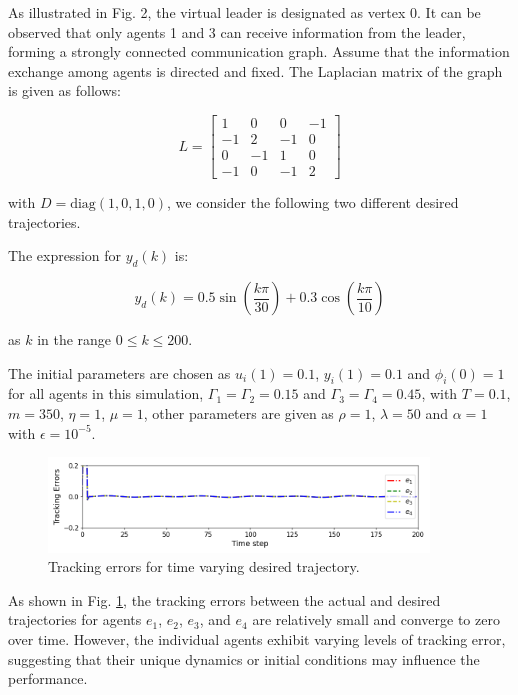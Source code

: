 \documentclass[journal,onecolumn]{IEEEtran}
\begin{document}
As illustrated in Fig. 2, the virtual leader is designated as vertex 0. It can be observed that only agents 1 and 3 can receive information from the leader, forming a strongly connected communication graph. Assume that the information exchange among agents is directed and fixed. The Laplacian matrix of the graph is given as follows:

\[
    L = \begin{bmatrix}
    1 & 0 & 0 & -1 \\
    -1 & 2 & -1 & 0 \\
    0 & -1 & 1 & 0 \\
    -1 & 0 & -1 & 2
    \end{bmatrix}
\]

with \( D = \text{diag}(1, 0, 1, 0) \), we consider the following two different desired trajectories.




The expression for \( y_d(k) \) is:

\[
y_d(k) = 0.5 \sin\left(\frac{k \pi}{30}\right) + 0.3  \cos\left(\frac{k \pi}{10}\right)
\]

as \( k \) in the range \( 0 \leq k \leq 200 \).

The initial parameters are chosen as \(u_i(1)=0.1\), \(y_i(1)=0.1\) and \(\phi_i(0)=1 \) for all agents in this simulation, \(\Gamma_{1}=\Gamma_{2}=0.15\) and \(\Gamma_{3}=\Gamma_{4}=0.45\), with \(T=0.1\), \(m=350\), \(\eta=1\), \(\mu=1\), other parameters are given as \(\rho=1\), \(\lambda=50\) and \(\alpha=1\) with \(\epsilon=10^{-5}\).
\begin{figure}[H]
    \centering
    \includegraphics[width=0.9\textwidth]{Figure_2.png}
    \caption{Tracking errors for time varying desired trajectory.}
    \label{fig:figure_2} %
\end{figure}

As shown in Fig. \ref{fig:figure_2}, the tracking errors between the actual and desired trajectories for agents $e_1$, $e_2$, $e_3$, and $e_4$ are relatively small and converge to zero over time. However, the individual agents exhibit varying levels of tracking error, suggesting that their unique dynamics or initial conditions may influence the performance.
\end{document}
